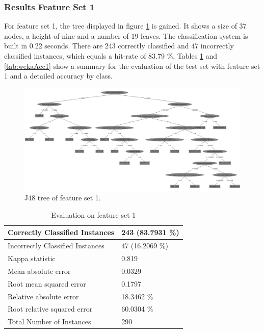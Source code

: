 \subsubsection{Results Feature Set 1}

For feature set 1, the tree displayed in figure \ref{fig:wekaTree1} is gained. It shows a size of 37 nodes, a height of nine and a number of 19 leaves. The classification system is built in 0.22 seconds. There are 243 correctly classified and 47 incorrectly classified instances, which equals a hit-rate of 83.79 \%. Tables \ref{tab:WekaEval1} and \ref{tab:wekaAcc1} show a summary for the evaluation of the test set with feature set 1 and a detailed accuracy by class.

\begin{figure}[h]
	\centering
  \includegraphics[width=\textwidth]{images/weka/weka_tree_1.png}
	\caption{J48 tree of feature set 1.}
	\label{fig:wekaTree1}
\end{figure}

\begin{table}[h]
  \caption{Evaluation on feature set 1}
  \label{tab:WekaEval1} 
	\centering
	\footnotesize
	\begin{tabular}[c]{|l|l|}
	  \hline
		Correctly Classified Instances & 243 (83.7931 \%) \\
	  \hline
		Incorrectly Classified Instances & 47 (16.2069 \%) \\
	  \hline
		Kappa statistic & 0.819  \\
	  \hline
		Mean absolute error & 0.0329 \\
	  \hline
		Root mean squared error & 0.1797 \\
	  \hline
		Relative absolute error & 18.3462 \% \\
	  \hline
		Root relative squared error & 60.0304 \% \\
	  \hline
		Total Number of Instances & 290  \\
	  \hline
	\end{tabular}
\end{table}

